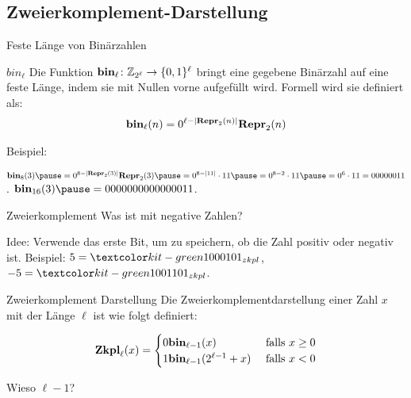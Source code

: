 \subsection{Zweierkomplement-Darstellung}

\begin{frame}{Feste Länge von Binärzahlen}
	\pause
	
	\begin{block}{$bin_\ell$}
		Die Funktion $\textbf{bin}_{\ell}\colon \mathbb{Z}_{2^{\ell}} \to \{0,1\}^{\ell}$ \p  bringt eine gegebene Binärzahl auf eine feste Länge\p , indem sie mit Nullen vorne aufgefüllt wird. \p Formell wird sie definiert als:\p
		\begin{align*}\textbf{bin}_{\ell}(n) = 0^{\ell- |\textbf{Repr}_2(n)|} \textbf{Repr}_2(n)\end{align*}
	\end{block}

	\pause Beispiel:
	\begin{itemize}
		\pitem $\fbin_8(3) \p = 0^{8 - |\fRepr_2(3)|}\fRepr_2(3) \p = 0^{8 - |11|}\cdot 11 \p = 0^{8 - 2} \cdot 11 \p = 0^6 \cdot 11 = 00000011$.
		\pitem $\fbin_{16}(3) \p = 0000000000000011$.
	\end{itemize}
\end{frame}

\newcommand{\definitionOfZkpl}{
\begin{align*}
\fZkpl_{\ell}(x) =
\begin{cases}
0 \fbin_{\ell-1}(x) & \text{ falls } x\geq 0 \\
1 \fbin_{\ell-1}(2^{\ell-1} + x) & \text{ falls } x< 0 
\end{cases}
\end{align*}
}

\begin{frame}{Zweierkomplement}
	\p Was ist mit negative Zahlen?
	
	\begin{itemize}
		\pitem Idee: Verwende das erste Bit, um zu speichern, ob die Zahl positiv oder negativ ist.
		\pitem Beispiel: \p $5 = \markGreen{0}101_{zkpl}$\p , $-5 = \markGreen{1}101_{zkpl}$.
	\end{itemize}

	\pause

	\begin{block}{Zweierkomplement Darstellung}
	Die Zweierkomplementdarstellung einer Zahl $x$ \p mit der Länge $\ell$ ist wie folgt definiert:\p
	\definitionOfZkpl		
	\end{block}

	\begin{itemize}
		\pitem Wieso $\ell - 1$?
	\end{itemize}
	
\end{frame}

